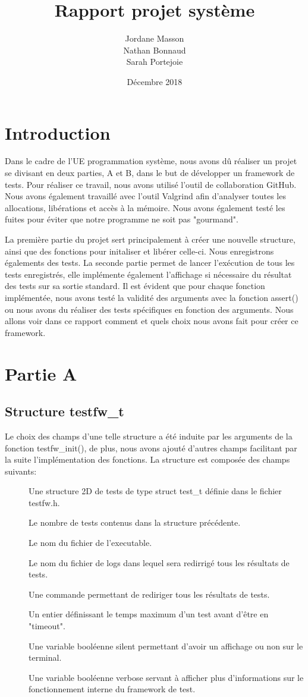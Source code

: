 \documentclass{article}
\title{Rapport projet système}
\author{Jordane Masson \\ Nathan Bonnaud \\ Sarah Portejoie}
\date{Décembre 2018}
\begin{document}
\maketitle

\section{Introduction}
Dans le cadre de l'UE programmation système, nous avons dû réaliser un projet se divisant en deux parties, A et B, dans le but de développer un framework de tests. Pour réaliser ce travail, nous avons utilisé l'outil de collaboration GitHub. Nous avons également travaillé avec l'outil Valgrind afin d'analyser toutes les allocations, libérations et accès à la mémoire. Nous avons également testé les fuites pour éviter que notre programme ne soit pas "gourmand".


	La première partie du projet sert principalement à créer une nouvelle structure, ainsi que des fonctions pour initaliser et libérer celle-ci. Nous enregistrons égalements des tests. La seconde partie permet de lancer l'exécution de tous les tests enregistrés, elle implémente également l'affichage si nécessaire du résultat des tests sur sa sortie standard.  Il est évident que pour chaque fonction implémentée, nous avons testé la validité des arguments avec la fonction assert() ou nous avons du réaliser des tests spécifiques en fonction des arguments.
Nous allons voir dans ce rapport comment et quels choix nous avons fait pour créer ce framework.
    
   
\section{Partie A}   
\subsection{Structure testfw\_t}
Le choix des champs d'une telle structure a été induite par les arguments de la fonction testfw\_init(), de plus, 
 nous avons ajouté d'autres champs facilitant par la suite l'implémentation des fonctions. La structure est composée des champs suivants:
 \begin{description}
 \item[] Une structure 2D de tests de type struct test\_t définie dans le fichier testfw.h. 
 \item[] Le nombre de tests contenus dans la structure précédente.
 \item[] Le nom du fichier de l'executable. 
 \item[] Le nom du fichier de logs dans lequel sera redirrigé tous les résultats de tests.
 \item[] Une commande  permettant de rediriger tous les résultats de tests.
 \item[] Un entier définissant le temps maximum d'un test avant d'être en "timeout".
 \item[] Une variable booléenne silent permettant d'avoir un affichage ou non sur le terminal. 
 \item[] Une variable booléenne verbose servant à afficher plus d'informations sur le fonctionnement interne du framework de test.
\end{description}
\end{document}
